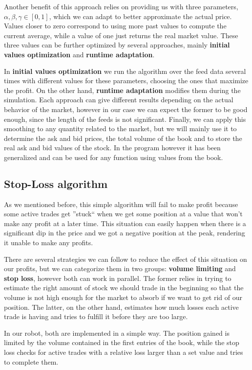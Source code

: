 \documentclass[8 pt]{article}
\begin{document}
\begin{multicols*}{2}
  Another benefit of this approach relies on providing us with three parameters, $\alpha, \beta, \gamma \in [0, 1]$, which we can adapt to better approximate the actual price. Values closer to zero correspond to using more past values to compute the current average, while a value of one just returns the real market value. These three values can be further optimized by several approaches, mainly \textbf{initial values optimization} and \textbf{runtime adaptation}.

  In \textbf{initial values optimization} we run the algorithm over the feed data several times with different values for these parameters, choosing the ones that maximize the profit. On the other hand, \textbf{runtime adaptation} modifies them during the simulation. Each approach can give different results depending on the actual behavior of the market, however in our case we can expect the former to be good enough, since the length of the feeds is not significant.
  Finally, we can apply this smoothing to any quantity related to the market, but we will mainly use it to determine the ask and bid prices, the total volume of the book and to store the real ask and bid values of the stock. In the program however it has been generalized and can be used for any function using values from the book.

  \subsection{Stop-Loss algorithm}

  As we mentioned before, this simple algorithm will fail to make profit because some active trades get ''stuck`` when we get some position at a value that won't make any profit at a later time. This situation can easily happen when there is a significant dip in the price and we got a negative position at the peak, rendering it unable to make any profits.

  There are several strategies we can follow to reduce the effect of this situation on our profits, but we can categorize them in two groups: \textbf{volume limiting} and \textbf{stop loss}, however both can work in parallel. The former relies in trying to estimate the right amount of stock we should trade in the beginning so that the volume is not high enough for the market to absorb if we want to get rid of our position. The latter, on the other hand, estimates how much losses each active trade is having and tries to fulfill it before they are too large.

  In our robot, both are implemented in a simple way. The position gained is limited by the volume contained in the first entries of the book, while the stop loss checks for active trades with a relative loss larger than a set value and tries to complete them.


\end{multicols*}
\end{document}

